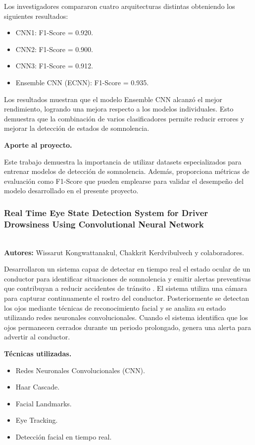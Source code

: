 \documentclass[conference]{IEEEtran}
\begin{document}
Los investigadores compararon cuatro arquitecturas distintas obteniendo los siguientes resultados:

\begin{itemize}
\item CNN1: F1-Score = 0.920.
\item CNN2: F1-Score = 0.900.
\item CNN3: F1-Score = 0.912.
\item Ensemble CNN (ECNN): F1-Score = 0.935.
\end{itemize}

Los resultados muestran que el modelo Ensemble CNN alcanzó el mejor rendimiento, logrando una mejora respecto a los modelos individuales. Esto demuestra que la combinación de varios clasificadores permite reducir errores y mejorar la detección de estados de somnolencia.

\textbf{Aporte al proyecto.}

Este trabajo demuestra la importancia de utilizar datasets especializados para entrenar modelos de detección de somnolencia. Además, proporciona métricas de evaluación como F1-Score que pueden emplearse para validar el desempeño del modelo desarrollado en el presente proyecto.\\


\subsubsection{\textbf{Real Time Eye State Detection System for Driver Drowsiness Using Convolutional Neural Network}} \mbox{}\\

\textbf{Autores:} Wissarut Kongwattanakul, Chakkrit Kerdvibulvech y colaboradores.

Desarrollaron un sistema capaz de detectar en tiempo real el estado ocular de un conductor para identificar situaciones de somnolencia y emitir alertas preventivas que contribuyan a reducir accidentes de tránsito \parencite{kongcharoen2020}.
El sistema utiliza una cámara para capturar continuamente el rostro del conductor. Posteriormente se detectan los ojos mediante técnicas de reconocimiento facial y se analiza su estado utilizando redes neuronales convolucionales. Cuando el sistema identifica que los ojos permanecen cerrados durante un periodo prolongado, genera una alerta para advertir al conductor.

\textbf{Técnicas utilizadas.}

\begin{itemize}
\item Redes Neuronales Convolucionales (CNN).
\item Haar Cascade.
\item Facial Landmarks.
\item Eye Tracking.
\item Detección facial en tiempo real.
\end{itemize}
\end{document}
